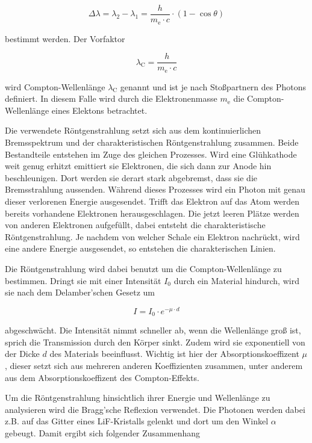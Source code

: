 \begin{equation}
    \Delta \lambda = \lambda _2 - \lambda _1 = \frac{h}{m_\text{e} \cdot c} \cdot \left(1 - \cos{\theta}\right)
    \label{eq:deltalambda}
\end{equation}

bestimmt werden.
Der Vorfaktor  

\begin{equation}
    \lambda _\text{C} = \frac{h}{m_\text{e} \cdot c}
    \label{eq:compton}
\end{equation}

wird Compton-Wellenlänge $\lambda _\text{C}$ genannt und ist je nach Stoßpartnern des Photons definiert.
In diesem Falle wird durch die Elektronenmasse $m_\text{e}$ die Compton-Wellenlänge eines Elektons betrachtet.

Die verwendete Röntgenstrahlung setzt sich aus dem kontinuierlichen Bremsspektrum und der charakteristischen Röntgenstrahlung zusammen.
Beide Bestandteile entstehen im Zuge des gleichen Prozesses.
Wird eine Glühkathode weit genug erhitzt emittiert sie Elektronen, die sich dann zur Anode hin beschleunigen.
Dort werden sie derart stark abgebremst, dass sie die Bremsstrahlung aussenden. 
Während dieses Prozesses wird ein Photon mit genau dieser verlorenen Energie ausgesendet.
Trifft das Elektron auf das Atom werden bereits vorhandene Elektronen herausgeschlagen.
Die jetzt leeren Plätze werden von anderen Elektronen aufgefüllt, dabei entsteht die charakteristische Röntgenstrahlung.
Je nachdem von welcher Schale ein Elektron nachrückt, wird eine andere Energie ausgesendet, so entstehen die charakterischen Linien.

Die Röntgenstrahlung wird dabei benutzt um die Compton-Wellenlänge zu bestimmen.
Dringt sie mit einer Intensität $I_0$ durch ein Material hindurch, wird sie nach dem Delamber'schen Gesetz um

\begin{equation}
    I = I_0 \cdot e^{- \mu \cdot d}
    \label{eq:delamber}
\end{equation}

abgeschwächt.
Die Intensität nimmt schneller ab, wenn die Wellenlänge groß ist, sprich die Transmission durch den Körper sinkt.
Zudem wird sie exponentiell von der Dicke $d$ des Materials beeinflusst.
Wichtig ist hier der Absorptionskoeffizent $\mu$, dieser setzt sich aus mehreren anderen Koeffizienten zusammen, unter anderem aus dem Absorptionskoeffizent des Compton-Effekts.

Um die Röntgenstrahlung hinsichtlich ihrer Energie und Wellenlänge zu analysieren wird die Bragg'sche Reflexion verwendet.
Die Photonen werden dabei z.B. auf das Gitter eines LiF-Kristalls gelenkt und dort um den Winkel $\alpha$ gebeugt.
Damit ergibt sich folgender Zusammenhang

